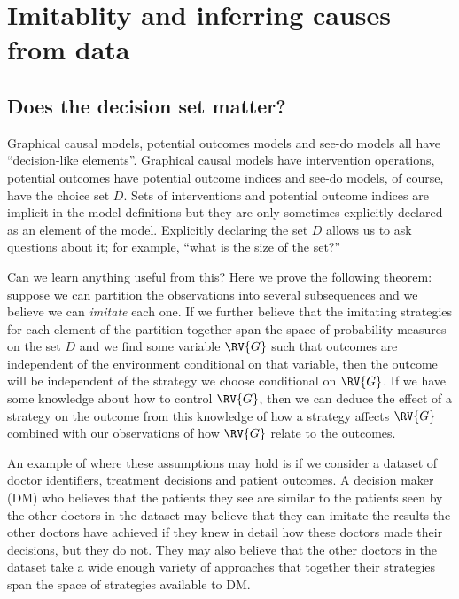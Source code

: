 

\chapter{Imitablity and inferring causes from data}\label{ch:inferring_causes}

\section{Does the decision set matter?}

Graphical causal models, potential outcomes models and see-do models all have ``decision-like elements''. Graphical causal models have intervention operations, potential outcomes have potential outcome indices and see-do models, of course, have the choice set $D$. Sets of interventions and potential outcome indices are implicit in the model definitions but they are only sometimes explicitly declared as an element of the model. Explicitly declaring the set $D$ allows us to ask questions about it; for example, ``what is the size of the set?''

Can we learn anything useful from this? Here we prove the following theorem: suppose we can partition the observations into several subsequences and we believe we can \emph{imitate} each one. If we further believe that the imitating strategies for each element of the partition together span the space of probability measures on the set $D$ and we find some variable $\RV{G}$ such that outcomes are independent of the environment conditional on that variable, then the outcome will be independent of the strategy we choose conditional on $\RV{G}$. If we have some knowledge about how to control $\RV{G}$, then we can deduce the effect of a strategy on the outcome from this knowledge of how a strategy affects $\RV{G}$ combined with our observations of how $\RV{G}$ relate to the outcomes.

An example of where these assumptions may hold is if we consider a dataset of doctor identifiers, treatment decisions and patient outcomes. A decision maker (DM) who believes that the patients they see are similar to the patients seen by the other doctors in the dataset may believe that they can imitate the results the other doctors have achieved if they knew in detail how these doctors made their decisions, but they do not. They may also believe that the other doctors in the dataset take a wide enough variety of approaches that together their strategies span the space of strategies available to DM.

